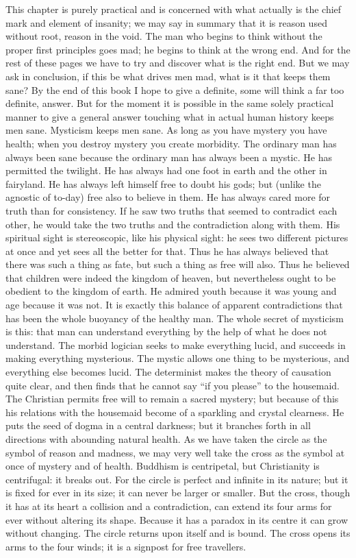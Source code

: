 This chapter is purely practical and is concerned with what actually is the chief mark and element of insanity; we may say in summary that it is reason used without root, reason in the void. The man who begins to think without the proper first principles goes mad; he begins to think at the wrong end. And for the rest of these pages we have to try and discover what is the right end. But we may ask in conclusion, if this be what drives men mad, what is it that keeps them sane? By the end of this book I hope to give a definite, some will think a far too definite, answer. But for the moment it is possible in the same solely practical manner to give a general answer touching what in actual human history keeps men sane. Mysticism keeps men sane. As long as you have mystery you have health; when you destroy mystery you create morbidity. The ordinary man has always been sane because the ordinary man has always been a mystic. He has permitted the twilight. He has always had one foot in earth and the other in fairyland. He has always left himself free to doubt his gods; but (unlike the agnostic of to-day) free also to believe in them. He has always cared more for truth than for consistency. If he saw two truths that seemed to contradict each other, he would take the two truths and the contradiction along with them. His spiritual sight is stereoscopic, like his physical sight: he sees two different pictures at once and yet sees all the better for that. Thus he has always believed that there was such a thing as fate, but such a thing as free will also. Thus he believed that children were indeed the kingdom of heaven, but nevertheless ought to be obedient to the kingdom of earth. He admired youth because it was young and age because it was not. It is exactly this balance of apparent contradictions that has been the whole buoyancy of the healthy man. The whole secret of mysticism is this: that man can understand everything by the help of what he does not understand. The morbid logician seeks to make everything lucid, and succeeds in making everything mysterious. The mystic allows one thing to be mysterious, and everything else becomes lucid. The determinist makes the theory of causation quite clear, and then finds that he cannot say “if you please” to the housemaid. The Christian permits free will to remain a sacred mystery; but because of this his relations with the housemaid become of a sparkling and crystal clearness. He puts the seed of dogma in a central darkness; but it branches forth in all directions with abounding natural health. As we have taken the circle as the symbol of reason and madness, we may very well take the cross as the symbol at once of mystery and of health. Buddhism is centripetal, but Christianity is centrifugal: it breaks out. For the circle is perfect and infinite in its nature; but it is fixed for ever in its size; it can never be larger or smaller. But the cross, though it has at its heart a collision and a contradiction, can extend its four arms for ever without altering its shape. Because it has a paradox in its centre it can grow without changing. The circle returns upon itself and is bound. The cross opens its arms to the four winds; it is a signpost for free travellers.

